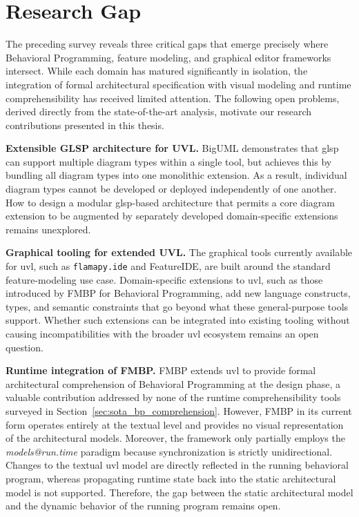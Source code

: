 \section{Research Gap}
\label{sec:research_gap}
 
The preceding survey reveals three critical gaps that emerge precisely where Behavioral Programming, feature modeling, and graphical editor frameworks intersect.
While each domain has matured significantly in isolation, the integration of formal architectural specification with visual modeling and runtime comprehensibility has received limited attention.
The following open problems, derived directly from the state-of-the-art analysis, motivate our research contributions presented in this thesis.
 
\textbf{Extensible GLSP architecture for UVL.}
BigUML demonstrates that \gls{glsp} can support multiple diagram types within a single tool, but achieves this by bundling all diagram types into one monolithic extension.
As a result, individual diagram types cannot be developed or deployed independently of one another.
How to design a modular \gls{glsp}-based architecture that permits a core diagram extension to be augmented by separately developed domain-specific extensions remains unexplored.
 
\textbf{Graphical tooling for extended UVL.}
The graphical tools currently available for \gls{uvl}, such as \texttt{flamapy.ide} and FeatureIDE, are built around the standard feature-modeling use case.
Domain-specific extensions to \gls{uvl}, such as those introduced by FMBP for Behavioral Programming, add new language constructs, types, and semantic constraints that go beyond what these general-purpose tools support.
Whether such extensions can be integrated into existing tooling without causing incompatibilities with the broader \gls{uvl} ecosystem remains an open question.
 
\textbf{Runtime integration of FMBP.}
FMBP extends \gls{uvl} to provide formal architectural comprehension of Behavioral Programming at the design phase, a valuable contribution addressed by none of the runtime comprehensibility tools surveyed in Section~\ref{sec:sota_bp_comprehension}.
However, FMBP in its current form operates entirely at the textual level and provides no visual representation of the architectural models.
Moreover, the framework only partially employs the \textit{models@run.time} paradigm because synchronization is strictly unidirectional.
Changes to the textual \gls{uvl} model are directly reflected in the running behavioral program, whereas propagating runtime state back into the static architectural model is not supported.
Therefore, the gap between the static architectural model and the dynamic behavior of the running program remains open.


